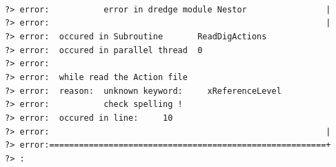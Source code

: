   \\ \hspace*{3mm} \texttt{\small{?>~error:~~~~~~~~~~~error~in~dredge~module~Nestor~~~~~~~~~~~~~~~~|}}
  \\ \hspace*{3mm} \texttt{\small{?>~error:~~~~~~~~~~~~~~~~~~~~~~~~~~~~~~~~~~~~~~~~~~~~~~~~~~~~~~~~|}}
  \\ \hspace*{3mm} \texttt{\small{?>~error:~~occured~in~Subroutine~~~~~~~ReadDigActions}}
  \\ \hspace*{3mm} \texttt{\small{?>~error:~~occured~in~parallel~thread~~0}}
  \\ \hspace*{3mm} \texttt{\small{?>~error:}}
  \\ \hspace*{3mm} \texttt{\small{?>~error:~~while~read~the~Action~file}}
  \\ \hspace*{3mm} \texttt{\small{?>~error:~~reason:~~unknown~keyword:~~~~~xReferenceLevel}}
  \\ \hspace*{3mm} \texttt{\small{?>~error:~~~~~~~~~~~check~spelling~!}}
  \\ \hspace*{3mm} \texttt{\small{?>~error:~~occured~in~line:~~~~~10}}
  \\ \hspace*{3mm} \texttt{\small{?>~error:~~~~~~~~~~~~~~~~~~~~~~~~~~~~~~~~~~~~~~~~~~~~~~~~~~~~~~~~|}}
  \\ \hspace*{3mm} \texttt{\small{?>~error:========================================================+}}
  \\ \hspace*{3mm} \texttt{\small{?>~:}}
%
%
\newpage
\setcounter{secnumdepth}{3}
